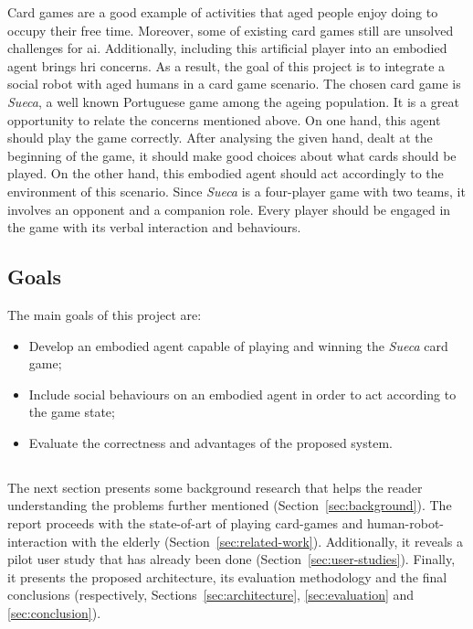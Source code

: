 Card games are a good example of activities that aged people enjoy doing to occupy their free time.
Moreover, some of existing card games still are unsolved challenges for \gls{ai}.
Additionally, including this artificial player into an embodied agent brings \gls{hri} concerns.
As a result, the goal of this project is to integrate a social robot with aged humans in a card game scenario.
The chosen card game is \emph{Sueca}, a well known Portuguese game among the ageing population.
It is a great opportunity to relate the concerns mentioned above.
On one hand, this agent should play the game correctly.
After analysing the given hand, dealt at the beginning of the game, it should make good choices about what cards should be played.
On the other hand, this embodied agent should act accordingly to the environment of this scenario.
Since \emph{Sueca} is a four-player game with two teams, it involves an opponent and a companion role.
Every player should be engaged in the game with its verbal interaction and behaviours.



\subsection{Goals}
\label{sec:goals}

The main goals of this project are:
\begin{itemize}
\item Develop an embodied agent capable of playing and winning the \emph{Sueca} card game;
\item Include social behaviours on an embodied agent in order to act according to the game state;
\item Evaluate the correctness and advantages of the proposed system.
\end{itemize}

\subsection*{\centering*}

The next section presents some background research that helps the reader understanding the problems further mentioned (Section~\ref{sec:background}).
The report proceeds with the state-of-art of playing card-games and human-robot-interaction with the elderly (Section~\ref{sec:related-work}).
Additionally, it reveals a pilot user study that has already been done (Section~\ref{sec:user-studies}).
Finally, it presents the proposed architecture, its evaluation methodology and the final conclusions (respectively, Sections~\ref{sec:architecture}, \ref{sec:evaluation} and \ref{sec:conclusion}).


